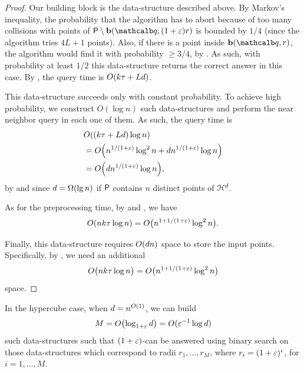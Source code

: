 \begin{proof}
    Our building block is the data-structure described above.  By
    Markov's inequality, the probability that the algorithm has to
    abort because of too many collisions with points of $\PntSet
    \setminus \Ball(\query,(1+\eps)r)$ is bounded by $1/4$ (since the
    algorithm tries $4L + 1$ points). Also, if there is a point inside
    $\Ball(\query,r)$, the algorithm would find it with probability
    $\geq 3/4$, by . As such, with probability at
    least $1/2$ this data-structure returns the correct answer in this
    case.  By , the query time is $O( k \tau +
    L d )$.

    This data-structure succeeds only with constant probability. To
    achieve high probability, we construct $O( \log n)$ such
    data-structures and perform the near neighbor query in each one of
    them.  As such, the query time is
    \begin{align*}
        & O\pth{ \MakesBig \pth{ k \tau + L \hdim} \log n }%
        \\&=%
        O\pth{n^{1/(1+\eps)} \log^2 n + \hdim n^{1/(1+\eps)} \log n}%
        \\&=%
        O \pth{ \hdim n^{1/(1+\eps)} \log n},
    \end{align*}
    by  and since $\hdim = \Omega\pth{\lg n
    }$ if ${\mathsf{P}}$ contains $n$ distinct points of
    $\EuScript{H}^{d}$.

    As for the preprocessing time, by  and
    , we have
    \begin{align*}
        O\pth{ nk\tau \log n } = O\bigl(n^{1+1/(1+\eps)} \log^2 n
        \bigr).
    \end{align*}

    Finally, this data-structure requires $O(d n)$ space to store
    the input points.  Specifically, by , we
    need an additional
    \[
        O\bigl( nk\tau \log n\bigr)%
        =%
        O\bigl( n^{1+1/(1+\eps)} \log^2 n\bigr)
    \]
    space.
\end{proof}

In the hypercube case, when $d = n^{O(1)}$, we can build
\[
M = O\pth{\log_{1+\eps} \hdim} = O(\eps^{-1} \log \hdim)
\]
such data-structures such that $(1+{\varepsilon})$-\ANNbr can be answered using
binary search on those data-structures which correspond to radii
$r_1,\ldots, r_M$, where $r_i =(1+{\varepsilon})^i$, for $i=1,\ldots, M$.

